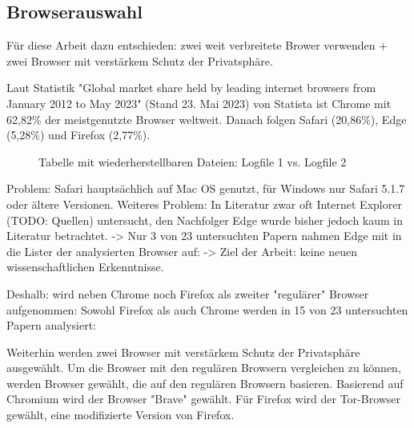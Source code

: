 \subsection{Browserauswahl}

Für diese Arbeit dazu entschieden: zwei weit verbreitete Brower verwenden + zwei Browser mit verstärkem Schutz der Privatsphäre.

Laut Statistik "Global market share held by leading internet browsers from January 2012 to May 2023" (Stand 23. Mai 2023) von Statista ist Chrome mit 62,82\% der meistgenutzte Browser weltweit.
Danach folgen Safari (20,86\%), Edge (5,28\%) und Firefox (2,77\%). 
\begin{figure}[h!]
	\caption{Tabelle mit wiederherstellbaren Dateien: Logfile 1 vs. Logfile 2}
\end{figure}

Problem: Safari hauptsächlich auf Mac OS genutzt, für Windows nur Safari 5.1.7 oder ältere Versionen.
Weiteres Problem: In Literatur zwar oft Internet Explorer (TODO: Quellen) untersucht, den Nachfolger Edge wurde bisher jedoch kaum in Literatur betrachtet.
	-> Nur 3 von 23 untersuchten Papern nahmen Edge mit in die Lister der analysierten Browser auf: \cite{Fayyad.2021, Horsman.2019, Gabet.2018}
	-> Ziel der Arbeit: keine neuen wissenschaftlichen Erkenntnisse.

Deshalb: wird neben Chrome noch Firefox als zweiter "regulärer" Browser aufgenommen:
Sowohl Firefox als auch Chrome werden in 15 von 23 untersuchten Papern analysiert: \cite{Aggarwal.2010, Oh.2011, Said.2011, Ohana.2013, Satvat.2014, Montasari.2015, Nalawade.2016, Rochmadi.2017, Gabet.2018, Md.2018, Muir.2019, Horsman.2019, Mahlous.2020, Fayyad.2021, Izzati.2022}

Weiterhin werden zwei Browser mit verstärkem Schutz der Privatsphäre ausgewählt.
Um die Browser mit den regulären Browsern vergleichen zu können, werden Browser gewählt, die auf den regulären Browsern basieren.
Basierend auf Chromium wird der Browser "Brave" gewählt.
Für Firefox wird der Tor-Browser gewählt, eine modifizierte Version von Firefox.

